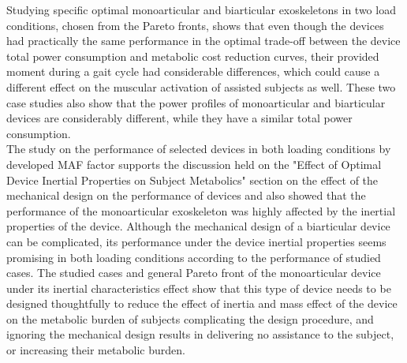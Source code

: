 \documentclass[10pt,letterpaper]{article}
\begin{document}
Studying specific optimal monoarticular and biarticular exoskeletons in two load conditions, chosen from the Pareto fronts, shows that even though the devices had practically the same performance in the optimal trade-off between the device total power consumption and metabolic cost reduction curves, their provided moment during a gait cycle had considerable differences, which could cause a different effect on the muscular activation of assisted subjects as well. These two case studies also show that the power profiles of monoarticular and biarticular devices are considerably different, while they have a similar total power consumption.\\
The study on the performance of selected devices in both loading conditions by developed MAF factor supports the discussion held on the "Effect of Optimal Device Inertial Properties on Subject Metabolics" section on the effect of the mechanical design on the performance of devices and also showed that the performance of the monoarticular exoskeleton was highly affected by the inertial properties of the device. Although the mechanical design of a biarticular device can be complicated, its performance under the device inertial properties seems promising in both loading conditions according to the performance of studied cases. The studied cases and general Pareto front of the monoarticular device under its inertial characteristics effect show that this type of device needs to be designed thoughtfully to reduce the effect of inertia and mass effect of the device on the metabolic burden of subjects complicating the design procedure, and ignoring the mechanical design results in delivering no assistance to the subject, or increasing their metabolic burden. 
\end{document}
